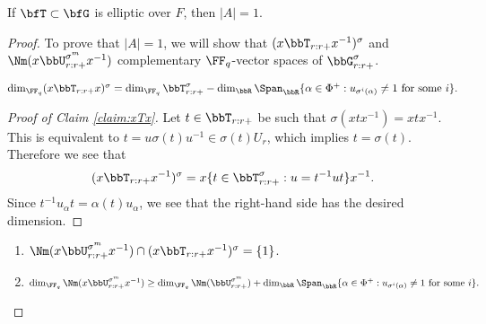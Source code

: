 \begin{proposition}\label{prop:|A| elliptic}
  If $\bfT \subset \bfG$ is elliptic over $F$, then $|A| = 1$.
\end{proposition}

\begin{proof}
  To prove that $|A| = 1$, we will show that $(x \bbT_{r:r+} x^{-1})^\sigma$ and $\Nm(x \bbU_{r:r+}^{\sigma^m} x^{-1})$ complementary $\FF_q$-vector spaces of $\bbG_{r:r+}^\sigma$.
  \begin{claim}\label{claim:xTx}
    $\dim_{\FF_q} (x \bbT_{r:r+} x)^\sigma = \dim_{\FF_q} \bbT_{r:r+}^\sigma - \dim_\bbR \Span_\bbR\{\alpha \in \Phi^+ : \text{$u_{\sigma^i(\alpha)} \neq 1$ for some $i$}\}.$
  \end{claim}

  \begin{proof}[Proof of Claim \ref{claim:xTx}]
    Let $t \in \bbT_{r:r+}$ be such that $\sigma(xtx^{-1}) = xtx^{-1}$. This is equivalent to $t = u \sigma(t) u^{-1} \in \sigma(t) U_r$, which implies $t = \sigma(t)$. Therefore we see that
    \begin{equation}\label{eq:xTx}
      (x\bbT_{r:r+} x^{-1})^\sigma = x\{t \in \bbT_{r:r+}^\sigma : u = t^{-1} u t\}x^{-1}.
    \end{equation}
    Since $t^{-1} u_\alpha t = \alpha(t) u_\alpha$, we see that the right-hand side has the desired dimension.
  \end{proof}

  \begin{claim}\label{claim:xUx} \mbox{}
    \begin{enumerate}
      \item $\Nm(x \bbU_{r:r+}^{\sigma^m} x^{-1}) \cap (x \bbT_{r:r+} x^{-1})^\sigma = \{1\}$.
      \item $\dim_{\FF_q} \Nm(x\bbU_{r:r+}^{\sigma^m} x^{-1}) \geq \dim_{\FF_q} \Nm(\bbU_{r:r+}^{\sigma^m}) + \dim_\bbR \Span_\bbR\{\alpha \in \Phi^+ : \text{$u_{\sigma^i(\alpha)} \neq 1$ for some $i$}\}.$
    \end{enumerate}
  \end{claim}


\end{proof}

